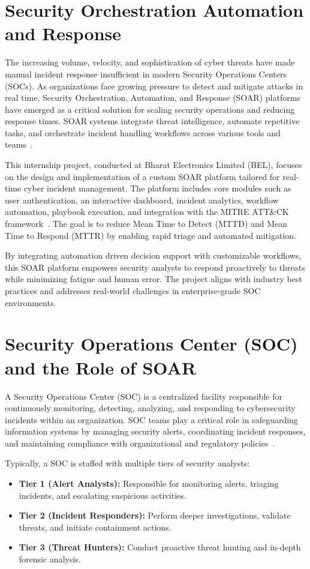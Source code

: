 \section{Security Orchestration Automation and Response}

The increasing volume, velocity, and sophistication of cyber threats have made manual incident response insufficient in modern Security Operations Centers (SOCs). As organizations face growing pressure to detect and mitigate attacks in real time, Security Orchestration, Automation, and Response (SOAR) platforms have emerged as a critical solution for scaling security operations and reducing response times. SOAR systems integrate threat intelligence, automate repetitive tasks, and orchestrate incident handling workflows across various tools and teams~\cite{paloalto_soar, ibm_soc}.

This internship project, conducted at Bharat Electronics Limited (BEL), focuses on the design and implementation of a custom SOAR platform tailored for real-time cyber incident management. The platform includes core modules such as user authentication, an interactive dashboard, incident analytics, workflow automation, playbook execution, and integration with the MITRE ATT\&CK framework~\cite{mitre_attack}. The goal is to reduce Mean Time to Detect (MTTD) and Mean Time to Respond (MTTR) by enabling rapid triage and automated mitigation.

By integrating automation driven decision support with customizable workflows, this SOAR platform empowers security analysts to respond proactively to threats while minimizing fatigue and human error. The project aligns with industry best practices and addresses real-world challenges in enterprise-grade SOC environments.

\section*{Security Operations Center (SOC) and the Role of SOAR}

A Security Operations Center (SOC) is a centralized facility responsible for continuously monitoring, detecting, analyzing, and responding to cybersecurity incidents within an organization. SOC teams play a critical role in safeguarding information systems by managing security alerts, coordinating incident responses, and maintaining compliance with organizational and regulatory policies~\cite{ibm_soc}.

Typically, a SOC is staffed with multiple tiers of security analysts:
\begin{itemize}[noitemsep, topsep=0pt]
    \item \textbf{Tier 1 (Alert Analysts):} Responsible for monitoring alerts, triaging incidents, and escalating suspicious activities.
    \item \textbf{Tier 2 (Incident Responders):} Perform deeper investigations, validate threats, and initiate containment actions.
    \item \textbf{Tier 3 (Threat Hunters):} Conduct proactive threat hunting and in-depth forensic analysis.
\end{itemize}

